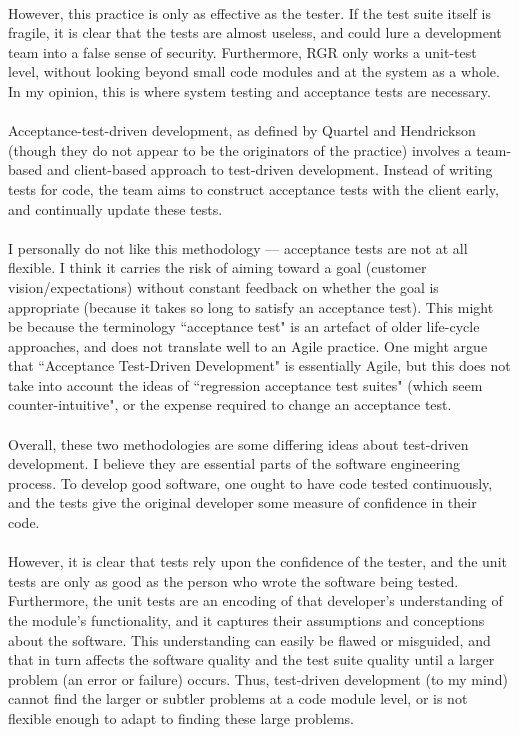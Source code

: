 \\
However, this practice is only as effective as the tester.
If the test suite itself is fragile, it is clear that the tests are almost useless, and could lure a
development team into a false sense of security.
Furthermore, RGR only works a unit-test level, without looking beyond small code modules and at the
system as a whole.
In my opinion, this is where system testing and acceptance tests are necessary.\\
\\
Acceptance-test-driven development, as defined by Quartel \cite{AcceptQuartel} and Hendrickson
\cite{AcceptHendr} (though they do not appear to be
the originators of the practice) involves a team-based and client-based approach to test-driven
development.
Instead of writing tests for code, the team aims to construct acceptance tests with the client
early, and continually update these tests.\\
\\
I personally do not like this methodology --- acceptance tests are not at all flexible. 
I think it carries the risk of aiming toward a goal (customer vision/expectations) without constant
feedback on whether the goal is appropriate (because it takes so long to satisfy an acceptance test).
This might be because the terminology ``acceptance test" is an artefact of older life-cycle
approaches, and does not translate well to an Agile practice.
One might argue that ``Acceptance Test-Driven Development" is essentially Agile, but this does not
take into account the ideas of ``regression acceptance test suites" (which seem counter-intuitive",
or the expense required to change an acceptance test.\\
\\
Overall, these two methodologies are some differing ideas about test-driven development.
I believe they are essential parts of the software engineering process.
To develop good software, one ought to have code tested continuously, and the tests give the
original developer some measure of confidence in their code.\\
\\
However, it is clear that tests rely upon the confidence of the tester, and the unit tests are only
as good as the person who wrote the software being tested.
Furthermore, the unit tests are an encoding of that developer's understanding of the module's
functionality, and it captures their assumptions and conceptions about the software.
This understanding can easily be flawed or misguided, and that in turn affects the software quality
and the test suite quality until a larger problem (an error or failure) occurs.
Thus, test-driven development (to my mind) cannot find the larger or subtler problems at a code module level, or is not flexible enough to adapt to
finding these large problems.

